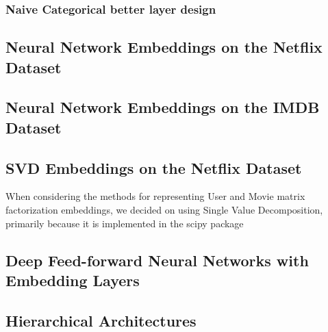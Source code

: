 \subsubsection{Naive Categorical better layer design}
\subsection{Neural Network Embeddings on the Netflix Dataset}
\subsection{Neural Network Embeddings on the IMDB Dataset}
\subsection{SVD Embeddings on the Netflix Dataset}
When considering the methods for representing User and Movie matrix factorization embeddings, we decided on using Single Value Decomposition, primarily because it is implemented in the scipy package 
\subsection{Deep Feed-forward Neural Networks with Embedding Layers}
\subsection{Hierarchical Architectures}
